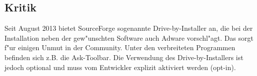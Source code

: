 \subsection{Kritik}
Seit August 2013 bietet SourceForge sogenannte Drive-by-Installer an, die bei der Installation 
neben der gew"unschten Software auch Adware vorschl"agt. Das sorgt f"ur einigen Unmut in der Community. 
Unter den verbreiteten Programmen befinden sich z.B. die Ask-Toolbar. Die Verwendung des
Drive-by-Installers ist jedoch optional und muss vom Entwickler explizit aktiviert werden (opt-in).

